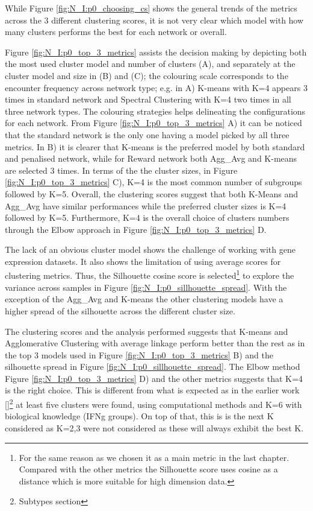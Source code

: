 While Figure \ref{fig:N_I:p0_choosing_cs} shows the general trends of the metrics across the 3 different clustering scores, it is not very clear which model with how many clusters performs the best for each network or overall.

Figure \ref{fig:N_I:p0_top_3_metrics} assists the decision making by depicting both the most used cluster model and number of clusters (A), and separately at the cluster model and size in (B) and (C); the colouring scale corresponds to the encounter frequency across network type; e.g. in A) K-means with K=4 appears 3 times in standard network and Spectral Clustering with K=4 two times in all three network types. The colouring strategies helps delineating the configurations for each network. From Figure \ref{fig:N_I:p0_top_3_metrics} A) it can be noticed that the standard network is the only one having a model picked by all three metrics. In B) it is clearer that K-means is the preferred model by both standard and penalised network, while for Reward network both Agg\_Avg and K-means are selected 3 times. In terms of the the cluster sizes, in Figure \ref{fig:N_I:p0_top_3_metrics} C), K=4 is the most common number of subgroups followed by K=5. Overall, the clustering scores suggest that both K-Means and Agg\_Avg have similar performances while the preferred cluster sizes is K=4 followed by K=5. Furthermore, K=4 is the overall choice of clusters numbers through the Elbow approach in Figure \ref{fig:N_I:p0_top_3_metrics} D.


The lack of an obvious cluster model shows the challenge of working with gene expression datasets. It also shows the limitation of using average scores for clustering metrics. Thus, the Silhouette cosine score is selected\footnote{For the same reason as we chosen it as a main metric in the last chapter. Compared with the other metrics the Silhouette score uses cosine as a distance which is more suitable for high dimension data.} to explore the variance across samples in Figure \ref{fig:N_I:p0_sillhouette_spread}. With the exception of the Agg\_Avg and K-means the other clustering models have a higher spread of the silhouette across the different cluster size.

The clustering scores and the analysis performed suggests that K-means and Agglomerative Clustering with average linkage perform better than the rest as in the top 3 models used in Figure \ref{fig:N_I:p0_top_3_metrics} B) and the silhouette spread in Figure \ref{fig:N_I:p0_sillhouette_spread}. The Elbow method Figure \ref{fig:N_I:p0_top_3_metrics} D) and the other metrics suggests that K=4 is the right choice. This is different from what is expected as in the earlier work \ref{}\footnote{Subtypes section} at least five clusters were found, using computational methods and K=6 with biological knowledge (IFNg groups). On top of that, this is is the next K considered as K=2,3 were not considered as these will always exhibit the best K.

